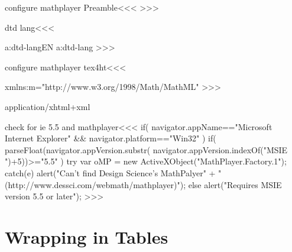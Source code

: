 \<configure mathplayer Preamble\><<<
\edef\Preamble{\Preamble,xht}
>>>



\<dtd lang\><<<
\expandafter
\ifx \csname a:dtd-lang\endcsname\relax EN\else
  \csname a:dtd-lang\endcsname
\fi
>>>

\<configure mathplayer tex4ht\><<<
       {}
   {\ifvmode \EndP\fi \IgnorePar{}\par\ShowPar}
     {xmlns:m="http://www.w3.org/1998/Math/MathML"\Hnewline
     }
>>>


application/xhtml+xml



\<check for ie 5.5 and mathplayer\><<<
if(   navigator.appName=="Microsoft Internet Explorer"   \Hnewline
   && navigator.platform=="Win32"                        \Hnewline
){                                                       \Hnewline
  if( parseFloat(navigator.appVersion.substr(            \Hnewline
       navigator.appVersion.indexOf("MSIE ")+5))>="5.5"  \Hnewline
  ){
    try {                                                  \Hnewline
      var oMP = new ActiveXObject("MathPlayer.Factory.1"); \Hnewline
    }                                                      \Hnewline
    catch(e) { alert("Can't find Design Science's MathPalyer" +  \Hnewline
          "(http://www.dessci.com/webmath/mathplayer)");} \Hnewline
  } else {                                                \Hnewline
    alert("Requires MSIE version 5.5 or later");          \Hnewline
} }                                                       \Hnewline
>>>

\section{Wrapping in Tables}

